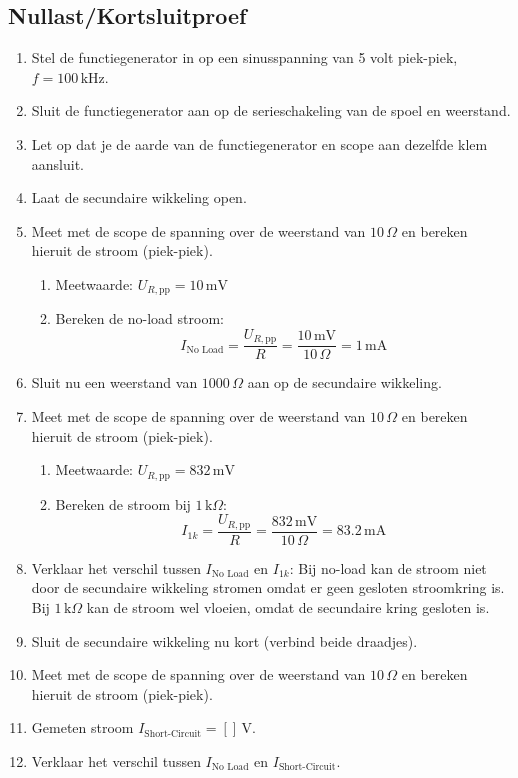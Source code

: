 \subsection{Nullast/Kortsluitproef}
\begin{enumerate}
    \item Stel de functiegenerator in op een sinusspanning van 5 volt piek-piek, \( f = 100 \, \text{kHz} \).
    \item Sluit de functiegenerator aan op de serieschakeling van de spoel en weerstand.
    \item Let op dat je de aarde van de functiegenerator en scope aan dezelfde klem aansluit.
    \item Laat de secundaire wikkeling open.
    \item Meet met de scope de spanning over de weerstand van \(10 \, \Omega\) en bereken hieruit de stroom (piek-piek).
    
    \begin{enumerate}
        \item Meetwaarde: \( U_{R,\text{pp}} = 10 \, \text{mV} \)
        \item Bereken de no-load stroom:
        \[
        I_{\text{No Load}} = \frac{U_{R,\text{pp}}}{R} = \frac{10 \, \text{mV}}{10 \, \Omega} = 1 \, \text{mA}
        \]
    \end{enumerate}

    \item Sluit nu een weerstand van \(1000 \, \Omega\) aan op de secundaire wikkeling.
    \item Meet met de scope de spanning over de weerstand van \(10 \, \Omega\) en bereken hieruit de stroom (piek-piek).
    
    \begin{enumerate}
        \item Meetwaarde: \( U_{R,\text{pp}} = 832 \, \text{mV} \)
        \item Bereken de stroom bij \(1 \, \text{k} \Omega\):
        \[
        I_{1k} = \frac{U_{R,\text{pp}}}{R} = \frac{832 \, \text{mV}}{10 \, \Omega} = 83.2 \, \text{mA}
        \]
    \end{enumerate}

    \item Verklaar het verschil tussen \( I_{\text{No Load}} \) en \( I_{1k} \): Bij no-load kan de stroom niet door de secundaire wikkeling stromen omdat er geen gesloten stroomkring is. Bij \(1 \, \text{k} \Omega\) kan de stroom wel vloeien, omdat de secundaire kring gesloten is.

    \item Sluit de secundaire wikkeling nu kort (verbind beide draadjes).
    \item Meet met de scope de spanning over de weerstand van \(10 \, \Omega\) en bereken hieruit de stroom (piek-piek).
    \item Gemeten stroom \( I_{\text{Short-Circuit}} = [ ] \, \text{V} \).
    \item Verklaar het verschil tussen \( I_{\text{No Load}} \) en \( I_{\text{Short-Circuit}} \).
\end{enumerate}
